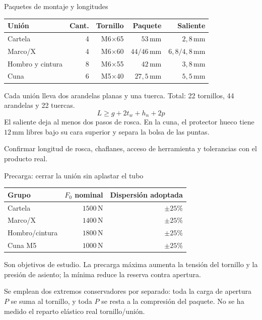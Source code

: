 \documentclass[10pt,aspectratio=169]{beamer}
\newcommand{\mm}{\,\mathrm{mm}}
\newcommand{\N}{\,\mathrm{N}}
\newcommand{\mcref}{Guía de diseño}
\begin{document}
\gdef\mcref{Mathcad: sección 19 / pág. 32-33}
\begin{frame}[t]{Paquetes de montaje y longitudes}

\begin{center}\begin{tabular}{lrrrr}\toprule
Unión & Cant. & Tornillo & Paquete & Saliente\\\midrule
Cartela & 4 & M6$\times$65 & $53\mm$ & $2{,}8\mm$\\
Marco/X & 4 & M6$\times$60 & $44/46\mm$ & $6{,}8/4{,}8\mm$\\
Hombro y cintura & 8 & M6$\times$55 & $42\mm$ & $3{,}8\mm$\\
Cuna & 6 & M5$\times$40 & $27{,}5\mm$ & $5{,}5\mm$\\\bottomrule\end{tabular}\end{center}
Cada unión lleva dos arandelas planas y una tuerca. Total: 22 tornillos, 44 arandelas y 22 tuercas.
\[
L\ge g+2t_w+h_n+2p
\]
El saliente deja al menos dos pasos de rosca. En la cuna, el protector hueco tiene $12\mm$ libres bajo su cara superior y separa la bolsa de las puntas.

Confirmar longitud de rosca, chaflanes, acceso de herramienta y tolerancias con el producto real.

\end{frame}

\gdef\mcref{Mathcad: sección 18 / pág. 30-31}
\begin{frame}[t]{Precarga: cerrar la unión sin aplastar el tubo}

\begin{center}\begin{tabular}{lrr}\toprule
Grupo & $F_0$ nominal & Dispersión adoptada\\\midrule
Cartela & $1500\N$ & $\pm25\%$\\
Marco/X & $1400\N$ & $\pm25\%$\\
Hombro/cintura & $1800\N$ & $\pm25\%$\\
Cuna M5 & $1000\N$ & $\pm25\%$\\\bottomrule\end{tabular}\end{center}
Son objetivos de estudio. La precarga máxima aumenta la tensión del tornillo y la presión de asiento; la mínima reduce la reserva contra apertura.

Se emplean dos extremos conservadores por separado: toda la carga de apertura $P$ se suma al tornillo, y toda $P$ se resta a la compresión del paquete. No se ha medido el reparto elástico real tornillo/unión.

\end{frame}
\end{document}
